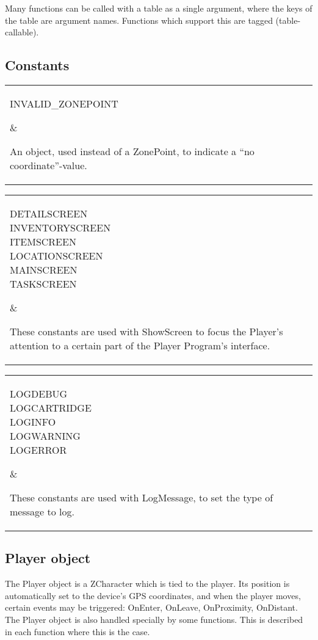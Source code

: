 \documentclass{article}
\begin{document}
Many functions can be called with a table as a single argument, where the keys
of the table are argument names. Functions which support this are tagged
(table-callable).

\newcommand\codedef[2]{\par\noindent\begin{tabular}{|l|l|}\hline\parbox{.4\textwidth}{#1}&\parbox{.5\textwidth}{#2}\\\hline\end{tabular}\par}
\newcommand\funcdef[4]{
	\par\vskip.5\baselineskip
	\par\noindent\textbf{Function:} #1 $\rightarrow$ #2\par
	\noindent\textbf{Arguments:} \parbox{.8\textwidth}{#3}\par
	\noindent\textbf{Description:} \parbox{.8\textwidth}{#4}\par
	\vskip.5\baselineskip
}
\newcommand\attrdef[3]{
	\par\vskip.5\baselineskip
	\par\noindent\textbf{Attribute:} #1 (#2)\par
	\noindent\textbf{Description:} \parbox{.8\textwidth}{#3}\par
	\vskip.5\baselineskip
}
\subsection{Constants}
\codedef{INVALID\_ZONEPOINT}{An object, used instead of a ZonePoint, to indicate a ``no coordinate''-value.}
\codedef{DETAILSCREEN\\INVENTORYSCREEN\\ITEMSCREEN\\LOCATIONSCREEN\\MAINSCREEN\\TASKSCREEN}{These constants are used with ShowScreen to focus the Player's attention to a certain part of the Player Program's interface.}
\codedef{LOGDEBUG\\LOGCARTRIDGE\\LOGINFO\\LOGWARNING\\LOGERROR}{These constants are used with LogMessage, to set the type of message to log.}

\subsection{Player object}
The Player object is a ZCharacter which is tied to the player. Its position is
automatically set to the device's GPS coordinates, and when the player moves,
certain events may be triggered: OnEnter, OnLeave, OnProximity, OnDistant. The
Player object is also handled specially by some functions. This is described in
each function where this is the case.
\end{document}
